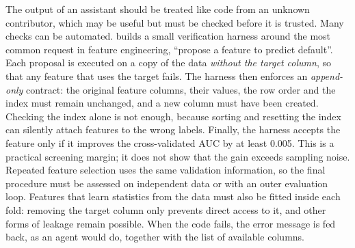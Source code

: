 The output of an assistant should be treated like code from an unknown contributor, which may be useful but must be checked before it is trusted.
Many checks can be automated.  builds a small verification harness around the most common request in
feature engineering, ``propose a feature to predict default''. Each proposal is executed on a copy of the data \emph{without the
target column}, so that any feature that uses the target fails. The harness then enforces an \emph{append-only} contract: the original feature
columns, their values, the row order and the index must remain unchanged, and a new column must have been created. Checking the index alone is not enough, because
sorting and resetting the index can silently attach features to the wrong labels. Finally, the harness accepts the feature only if it improves the cross-validated AUC by at least 0.005. This is a practical screening margin; it does not show that the gain exceeds sampling noise. Repeated feature selection uses the same validation information, so the
final procedure must be assessed on independent data or with an outer evaluation loop. Features that learn statistics
from the data must also be fitted inside each fold: removing the target column only prevents direct access to it, and other forms of leakage remain possible. When the code fails, the error message is fed back, as an agent would do, together with the
list of available columns.

